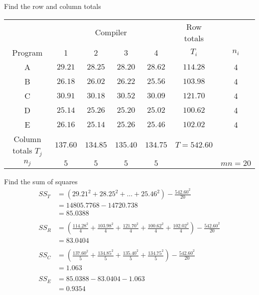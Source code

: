 \begin{example}
        \begin{step}{Find the row and column totals}
        \begin{center}
        \begin{tabular}{c|cccc|c|c}
                            & \multicolumn{4}{c}{Compiler}                  & Row totals    &           \\
        Program             & 1         & 2         & 3         & 4         & $T_i$         & $n_i$     \\
        \hline          
        A                   & $29.21$   & $28.25$   & $28.20$   & $28.62$   & $114.28$      & 4         \\
        B                   & $26.18$   & $26.02$   & $26.22$   & $25.56$   & $103.98$      & 4         \\
        C                   & $30.91$   & $30.18$   & $30.52$   & $30.09$   & $121.70$      & 4         \\
        D                   & $25.14$   & $25.26$   & $25.20$   & $25.02$   & $100.62$      & 4         \\
        E                   & $26.16$   & $25.14$   & $25.26$   & $25.46$   & $102.02$      & 4         \\
        \hline
        Column totals $T_j$ & $137.60$  & $134.85$  & $135.40$  & $134.75$  & $T = 542.60$  &           \\
        \hline
        $n_j$               & $5$       & $5$       & $5$       & $5$       &               & $mn = 20$ \\
        \end{tabular}
        \end{center}
        \end{step}

        \begin{step}{Find the sum of squares}
        \begin{align*}
        SS_T &= (29.21^2 + 28.25^2 + ... + 25.46^2) - \frac{542.60^2}{20} \\
        &= 14805.7768 - 14720.738\\
        &= 85.0388\\
        \\
        SS_R &= \left(\frac{114.28^2}{4} + \frac{103.98^2}{4} + \frac{121.70^2}{4} + \frac{100.62^2}{4} + \frac{102.02^2}{4}\right) - \frac{542.60^2}{20}\\
        &= 83.0404\\
        \\
        SS_C &= \left(\frac{137.60^2}{5} + \frac{134.85^2}{5} + \frac{135.40^2}{5} + \frac{134.75^2}{5}\right) - \frac{542.60^2}{20}\\
        &= 1.063\\
        \\
        SS_E &= 85.0388 - 83.0404 - 1.063\\
        &= 0.9354
        \end{align*}
        \end{step}


\end{example}

